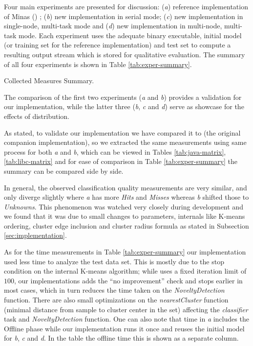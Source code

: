 Four main experiments are presented for discussion:
(\emph{a}) reference implementation of Minas () \cite{Faria2015minas};
(\emph{b}) new implementation in serial mode;
(\emph{c}) new implementation in single-node, multi-task mode and
(\emph{d}) new implementation in multi-node, multi-task mode.
Each experiment uses the adequate binary executable, initial model
(or training set for the reference implementation) and test set
to compute a resulting output stream which is stored for qualitative evaluation.
The summary of all four experiments is shown in Table \ref{tab:exper-summary}.

\begin{table}[hbt]
\begin{center}
  \caption{Collected Measures Summary.}
  \label{tab:exper-summary}
  
\end{center}
\end{table}

The comparison of the first two experiments (\emph{a} and \emph{b}) provides a
validation for our implementation, while the latter three (\emph{b}, \emph{c}
and \emph{d}) serve as showcase for the effects of distribution.

As stated, to validate our implementation we have compared it to 
(the original \minas companion implementation), so we extracted the same measurements
using same process for both \emph{a} and \emph{b}, which can be viewed in
Tables \ref{tab:java-matrix}, \ref{tab:libc-matrix} and for ease of comparison
in Table \ref{tab:exper-summary} the summary can be compared side by side.

In general, the observed classification quality measurements are very similar,
and only diverge slightly where \emph{a} has more \emph{Hits} and \emph{Misses}
whereas \emph{b} shifted those to \emph{Unknowns}.
This phenomenon was watched very closely during development and we found that it was due to
small changes to \minas parameters, \minas internals like K-means ordering,
cluster edge inclusion and cluster radius formula as stated in
Subsection \ref{sec:implementation}.

As for the time measurements in Table \ref{tab:exper-summary}
our implementation used less time to analyze the test data set.
This is mostly due to 
the stop condition
on the internal K-means algorithm; while  uses a fixed iteration
limit of $100$, our implementations adds the ``no improvement'' check
and stops earlier in most cases, which in turn reduces the time taken
on the \emph{NoveltyDetection} function.
There are also small optimizations on the \emph{nearestCluster} function
(minimal distance from sample to cluster center in the set)
affecting the \emph{classifier} task and \emph{NoveltyDetection} function.
One can also note that  time in \emph{a} includes the Offline phase while our
implementation runs it once and reuses the initial model for \emph{b}, \emph{c}
and \emph{d}. In the table the offline time this is shown as a separate column.

